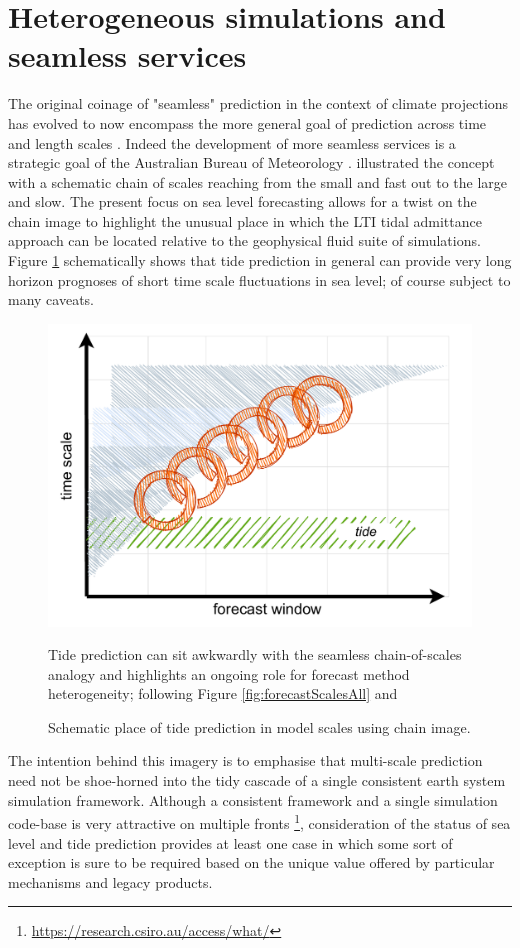 \section{Heterogeneous simulations and seamless services}
The original coinage of "seamless" prediction in the context of climate projections has evolved to now encompass the more general goal of prediction across time and length scales \citep{10.1127/metz/2020/1048}.
Indeed the development of more seamless services is a strategic goal of the Australian Bureau of Meteorology \citep{BOM2020}.
\citep{10.1175/bams-89-4-459} illustrated the concept with a schematic chain of scales reaching from the small and fast out to the large and slow.
The present focus on sea level forecasting allows for a twist on the chain image to highlight the unusual place in which the LTI tidal admittance approach can be located relative to the geophysical fluid suite of simulations.
Figure \ref{fig:forecastScalesChain} schematically shows that tide prediction in general can provide very long horizon prognoses of short time scale fluctuations in sea level; of course subject to many caveats.
\begin{figure}[h]\centering
        \includegraphics[width=\figwidthFull]{figures/diagrams/scales_with_chain.pdf} 
        \caption{Schematic place of tide prediction in model scales using chain image.}
                {Tide prediction can sit awkwardly with the seamless chain-of-scales analogy and highlights an ongoing role for forecast method heterogeneity; following Figure \ref{fig:forecastScalesAll} and \citep{10.1175/bams-89-4-459}}
        \label{fig:forecastScalesChain}
\end{figure}
The intention behind this imagery is to emphasise that multi-scale prediction need not be shoe-horned into the tidy cascade of a single consistent earth system simulation framework.
Although a consistent framework and a single simulation code-base is very attractive on multiple fronts  \footnote{\url{https://research.csiro.au/access/what/}}, consideration of the status of sea level and tide prediction provides at least one case in which some sort of exception is sure to be required based on the unique value offered by particular mechanisms and legacy products.  

